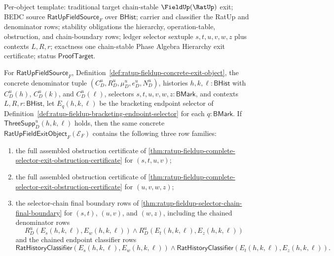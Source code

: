 Per-object template: traditional target chain-stable $\FieldUp(\RatUp)$ exit;
BEDC source $\mathsf{RatUpFieldSource}_F$ over $\mathsf{BHist}$; carrier and
classifier the RatUp and denominator rows; stability obligations the hierarchy,
operation-table, obstruction, and chain-boundary rows; ledger selector sextuple
$s,t,u,v,w,z$ plus contexts $L,R,r$; exactness one chain-stable Phase Algebra
Hierarchy exit certificate; status $\mathsf{ProofTarget}$.

\begin{theorem}
\label{thm:ratup-fieldup-concrete-two-step-obstruction-chain-package}
For $\mathsf{RatUpFieldSource}_F$,
Definition~\ref{def:ratup-fieldup-concrete-exit-object}, the concrete
denominator tuple $(C_D^u,R_D^u,\mu_D^u,e_D^u,N_D^u)$, histories
$h,k,\ell:\mathsf{BHist}$ with $C_D^u(h)$, $C_D^u(k)$, and $C_D^u(\ell)$,
selectors $s,t,u,v,w,z:\mathsf{BMark}$, and contexts
$L,R,r:\mathsf{BHist}$, let $E_q(h,k,\ell)$ be the bracketing endpoint selector
of Definition~\ref{def:ratup-fieldup-bracketing-endpoint-selector} for each
$q:\mathsf{BMark}$. If $\mathsf{ThreeSupp}_D^u(h,k,\ell)$ holds, then the same
concrete $\mathsf{RatUpFieldExitObject}_F(\mathcal E_F)$ contains the following
three row families:
\begin{enumerate}
  \item the full assembled obstruction certificate of
  \autoref{thm:ratup-fieldup-complete-selector-exit-obstruction-certificate} for
  $(s,t,u,v)$;
  \item the full assembled obstruction certificate of
  \autoref{thm:ratup-fieldup-complete-selector-exit-obstruction-certificate} for
  $(u,v,w,z)$;
  \item the selector-chain final boundary rows of
  \autoref{thm:ratup-fieldup-selector-chain-final-boundary} for $(s,t)$,
  $(u,v)$, and $(w,z)$, including the chained denominator rows
  $$
  R_D^u(E_s(h,k,\ell),E_w(h,k,\ell))
  \land
  R_D^u(E_t(h,k,\ell),E_z(h,k,\ell))
  $$
  and the chained endpoint classifier rows
  $$
  \mathsf{RatHistoryClassifier}(E_s(h,k,\ell),E_w(h,k,\ell))
  \land
  \mathsf{RatHistoryClassifier}(E_t(h,k,\ell),E_z(h,k,\ell)).
  $$
\end{enumerate}
\end{theorem}
